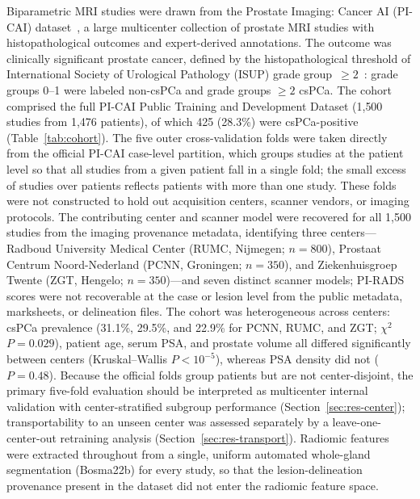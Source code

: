 \documentclass[11pt]{article}
\begin{document}
Biparametric MRI studies were drawn from the Prostate Imaging: Cancer AI
(PI-CAI) dataset~\citep{saha2023artificial}, a large multicenter collection of
prostate MRI studies with histopathological outcomes and expert-derived
annotations. The outcome was clinically significant prostate cancer, defined by
the histopathological threshold of International Society of Urological Pathology
(ISUP) grade group~$\geq 2$~\citep{epstein2016grade}: grade groups 0--1 were
labeled non-csPCa and grade groups $\geq 2$ csPCa. The cohort comprised the full
PI-CAI Public Training and Development Dataset (1{,}500 studies from 1{,}476
patients), of which 425 (28.3\%) were csPCa-positive
(Table~\ref{tab:cohort}). The five outer cross-validation folds were taken
directly from the official PI-CAI case-level partition, which groups studies at
the patient level so that all studies from a given patient fall in a single
fold; the small excess of studies over patients reflects patients with more than
one study. These folds were not constructed to hold out acquisition centers,
scanner vendors, or imaging protocols. The contributing center and scanner model
were recovered for all 1{,}500 studies from the imaging provenance metadata,
identifying three centers---Radboud University Medical Center (RUMC, Nijmegen;
$n=800$), Prostaat Centrum Noord-Nederland (PCNN, Groningen; $n=350$), and
Ziekenhuisgroep Twente (ZGT, Hengelo; $n=350$)---and seven distinct scanner
models; PI-RADS scores were not recoverable at the case or lesion level from the
public metadata, marksheets, or delineation files. The cohort was heterogeneous
across centers: csPCa prevalence (31.1\%, 29.5\%, and 22.9\% for PCNN, RUMC, and
ZGT; $\chi^2$ $P=0.029$), patient age, serum PSA, and prostate volume all
differed significantly between centers (Kruskal--Wallis $P<10^{-5}$), whereas
PSA density did not ($P=0.48$). Because the official folds group patients but are
not center-disjoint, the primary five-fold evaluation should be interpreted as
multicenter internal validation with center-stratified subgroup performance
(Section~\ref{sec:res-center}); transportability to an unseen center was assessed
separately by a leave-one-center-out retraining analysis
(Section~\ref{sec:res-transport}). Radiomic features were extracted throughout
from a single, uniform automated whole-gland segmentation (Bosma22b) for every
study, so that the lesion-delineation provenance present in the dataset did not
enter the radiomic feature space.
\end{document}
